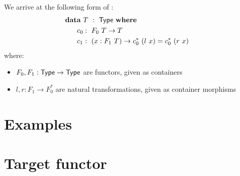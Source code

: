 \documentclass[a4paper,10pt]{report}
\begin{document}
We arrive at the following form of \hits:
%
\begin{alignat*}{2}
  &\rlap{$\data\ T\ :\ \Type\ \where$} \\
  &&\ \ c_0  &:\ F_0\ T \to T \\
  &&\ \ c_1  &:\ (x : F_1\ T) \to c_0^*\ (l\ x) = c_0^*\ (r\ x)
\end{alignat*}
%
where:
\begin{itemize}
\item $F_0, F_1 : \mathsf{Type} \to \mathsf{Type}$ are functors, given as containers
\item $l, r : F_1 \to F_0^*$ are natural transformations, given as container morphisms
\end{itemize}

\section{Examples}


\section{Target functor}
\end{document}

